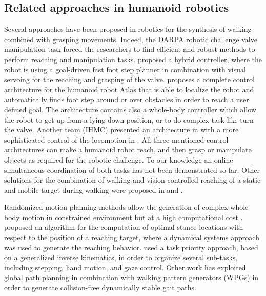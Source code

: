 \subsection{Related approaches in humanoid robotics}
Several  approaches have  been proposed in robotics for the synthesis of
walking combined with grasping movements. Indeed, the DARPA robotic challenge
valve manipulation task forced the researchers to find efficient and robust methods
to perform reaching and manipulation tasks. \cite{ref:Ajoudani2013} proposed
a hybrid controller, where the robot is using a goal-driven fast foot step planner in combination
with visual servoing for the reaching and grasping of the valve.
\cite{ref:kuindersma2015optimization} proposes
a complete control architecture for the humanoid robot Atlas that is able to localize the robot
and automatically finds foot step around or over obstacles in order to reach a user defined goal.
The architecture contains also a whole-body controller which allow the robot to get
up from a lying down position, or to do complex task like turn the valve.
Another team (IHMC) presented an architecture in \cite{ref:johnson2015team} with a more sophisticated
control of the locomotion in \cite{ref:Englsberger2015}.
All three mentioned control architectures can make a humanoid robot reach, and then
grasp or manipulate objects as required for the robotic challenge.
To our knowledge an online simultaneous coordination of both tasks has not been demonstrated so far.
Other solutions for the combination of walking and vision-controlled reaching of a static and mobile target during walking were proposed in \cite{ref:svdmsvey08} and \cite{ref:bjkeht13}.

Randomized motion planning methods allow the generation of complex whole body motion  in constrained environment but at a high computational cost \cite{ref:dklntl13,ref:kly11}.
\cite{ref:gtg10}  proposed an algorithm for the computation
of optimal stance locations with respect to the position of a reaching target, where a dynamical systems
approach was used to generate the reaching behavior.
\cite{yoshida2007give} used a task priority approach,
based on a  generalized inverse kinematics, in order to organize several sub-tasks, including stepping, hand motion,
and gaze control.
Other work has exploited global path planning in combination with walking pattern generators (WPGs) \cite{Kajita:icra:2003} in order to generate collision-free dynamically stable gait paths.


